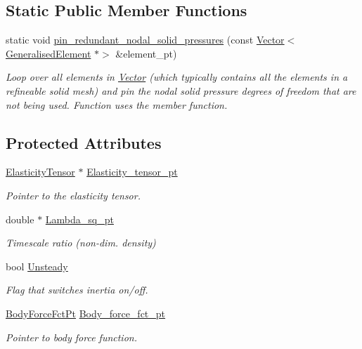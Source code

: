 \subsection*{Static Public Member Functions}
\begin{DoxyCompactItemize}
\item 
static void \hyperlink{classoomph_1_1LinearElasticityEquationsBase_ae4868b297fb79e9aa0e33a898efa51bb}{pin\+\_\+redundant\+\_\+nodal\+\_\+solid\+\_\+pressures} (const \hyperlink{classoomph_1_1Vector}{Vector}$<$ \hyperlink{classoomph_1_1GeneralisedElement}{Generalised\+Element} $\ast$$>$ \&element\+\_\+pt)
\begin{DoxyCompactList}\small\item\em Loop over all elements in \hyperlink{classoomph_1_1Vector}{Vector} (which typically contains all the elements in a refineable solid mesh) and pin the nodal solid pressure degrees of freedom that are not being used. Function uses the member function. \end{DoxyCompactList}\end{DoxyCompactItemize}
\subsection*{Protected Attributes}
\begin{DoxyCompactItemize}
\item 
\hyperlink{classoomph_1_1ElasticityTensor}{Elasticity\+Tensor} $\ast$ \hyperlink{classoomph_1_1LinearElasticityEquationsBase_a0d7307299ede86c07c002a86cf965a70}{Elasticity\+\_\+tensor\+\_\+pt}
\begin{DoxyCompactList}\small\item\em Pointer to the elasticity tensor. \end{DoxyCompactList}\item 
double $\ast$ \hyperlink{classoomph_1_1LinearElasticityEquationsBase_a2889063488b439d1ec746d20ac8b8f1f}{Lambda\+\_\+sq\+\_\+pt}
\begin{DoxyCompactList}\small\item\em Timescale ratio (non-\/dim. density) \end{DoxyCompactList}\item 
bool \hyperlink{classoomph_1_1LinearElasticityEquationsBase_ab90306067812bca9a8dc63b6dacf1355}{Unsteady}
\begin{DoxyCompactList}\small\item\em Flag that switches inertia on/off. \end{DoxyCompactList}\item 
\hyperlink{classoomph_1_1LinearElasticityEquationsBase_ada2fc7aa2569c35e28982f93a0749903}{Body\+Force\+Fct\+Pt} \hyperlink{classoomph_1_1LinearElasticityEquationsBase_a78c5d7f18c1c1661311ae1db92ab8f41}{Body\+\_\+force\+\_\+fct\+\_\+pt}
\begin{DoxyCompactList}\small\item\em Pointer to body force function. \end{DoxyCompactList}\end{DoxyCompactItemize}
